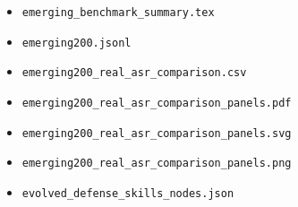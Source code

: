 \begin{itemize}
    \item \texttt{emerging\_benchmark\_summary.tex}
    \item \texttt{emerging200.jsonl}
    \item \texttt{emerging200\_real\_asr\_comparison.csv}
    \item \texttt{emerging200\_real\_asr\_comparison\_panels.pdf}
    \item \texttt{emerging200\_real\_asr\_comparison\_panels.svg}
    \item \texttt{emerging200\_real\_asr\_comparison\_panels.png}
    \item \texttt{evolved\_defense_skills\_nodes.json}
\end{itemize}
